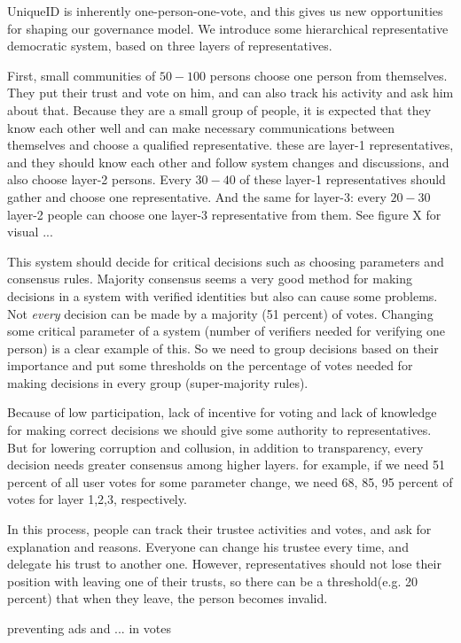 \documentclass[conference]{IEEEtran}
\begin{document}
UniqueID is inherently one-person-one-vote, and this gives us new opportunities for shaping our governance model. We introduce some hierarchical representative democratic system, based on three layers of representatives. 


First, small communities of $50-100$ persons choose one person from themselves. They put their trust and vote on him, and can also track his activity and ask him about that. Because they are a small group of people, it is expected that they know each other well and can make necessary communications between themselves and choose a qualified representative. these are layer-1 representatives, and they should know each other and follow system changes and discussions, and also choose layer-2 persons. Every $30-40$ of these layer-1 representatives should gather and choose one representative. And the same for layer-3: every $20-30$ layer-2 people can choose one layer-3 representative from them. See figure X for visual ...


This system should decide for critical decisions such as choosing parameters and consensus rules. Majority consensus seems a very good method for making decisions in a system with verified identities but also can cause some problems. Not \textit{every} decision can be made by a majority (51 percent) of votes. Changing some critical parameter of a system (number of verifiers needed for verifying one person) is a clear example of this. So we need to group decisions based on their importance and put some thresholds on the percentage of votes needed for making decisions in every group (super-majority rules).


Because of low participation, lack of incentive for voting and lack of knowledge for making correct decisions we should give some authority to representatives. But for lowering corruption and collusion, in addition to transparency, every decision needs greater consensus among higher layers. for example, if we need 51 percent of all user votes for some parameter change, we need 68, 85, 95 percent of votes for layer 1,2,3, respectively.


In this process, people can track their trustee activities and votes, and ask for explanation and reasons. Everyone can change his trustee every time, and delegate his trust to another one. However, representatives should not lose their position with leaving one of their trusts, so there can be a threshold(e.g. 20 percent) that when they leave, the person becomes invalid. 


preventing ads and ... in votes\\
\end{document}
